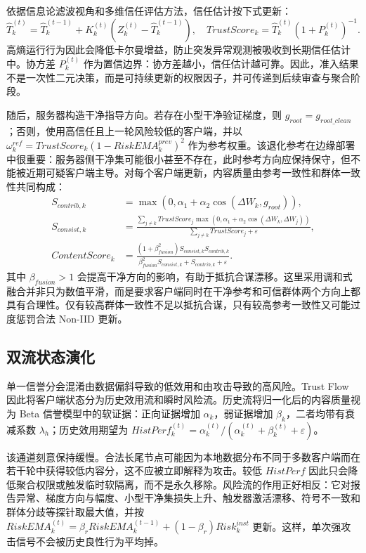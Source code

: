 \documentclass[10pt,a4paper,UTF8,fontset=fandol]{ctexart}
\begin{document}
依据信息论滤波视角\cite{chen2017maximum}和多维信任评估方法\cite{li2026multidimensional}，信任估计按下式更新：
\begin{equation}
    \hat{T}_{k}^{(t)}=\hat{T}_{k}^{(t-1)}+K_k^{(t)}(Z_k^{(t)}-\hat{T}_{k}^{(t-1)}),\quad
    TrustScore_k=\hat{T}_{k}^{(t)}(1+P_k^{(t)})^{-1}.
\end{equation}
高熵运行行为因此会降低卡尔曼增益，防止突发异常观测被吸收到长期信任估计中。协方差 $P_k^{(t)}$ 作为置信边界：协方差越小，信任估计越可靠。因此，准入结果不是一次性二元决策，而是可持续更新的权限因子，并可传递到后续审查与聚合阶段。

随后，服务器构造干净指导方向。若存在小型干净验证梯度，则 $g_{root}=g_{root\_clean}$；否则，使用高信任且上一轮风险较低的客户端，并以 $\omega_k^{ref}=TrustScore_k(1-RiskEMA_k^{prev})^2$ 作为参考权重。该退化参考在边缘部署中很重要：服务器侧干净集可能很小甚至不存在，此时参考方向应保持保守，但不能被近期可疑客户端主导。对每个客户端更新，内容质量由参考一致性和群体一致性共同构成：
\begin{align}
    S_{contrib,k}  & =\max(0,\alpha_1+\alpha_2\cos(\Delta W_k,g_{root})),                                  \\
    S_{consist,k}  & =\frac{\sum_{j\ne k}TrustScore_j\max(0,\alpha_1+\alpha_2\cos(\Delta W_k,\Delta W_j))}
    {\sum_{j\ne k}TrustScore_j+\varepsilon},                                                               \\
    ContentScore_k & =\frac{(1+\beta_{fusion}^2)S_{consist,k}S_{contrib,k}}
    {\beta_{fusion}^2S_{consist,k}+S_{contrib,k}+\varepsilon}.
\end{align}
其中 $\beta_{fusion}>1$ 会提高干净方向的影响，有助于抵抗合谋漂移。这里采用调和式融合并非只为数值平滑，而是要求客户端同时在干净参考和可信群体两个方向上都具有合理性。仅有较高群体一致性不足以抵抗合谋，只有较高参考一致性又可能过度惩罚合法 Non-IID 更新。

\subsection{双流状态演化}

单一信誉分会混淆由数据偏斜导致的低效用和由攻击导致的高风险。Trust Flow 因此将客户端状态分为历史效用流和瞬时风险流。历史流将归一化后的内容质量视为 Beta 信誉模型中的软证据：正向证据增加 $\alpha_k$，弱证据增加 $\beta_k$，二者均带有衰减系数 $\lambda_h$；历史效用期望为 $HistPerf_k^{(t)}=\alpha_k^{(t)}/(\alpha_k^{(t)}+\beta_k^{(t)}+\varepsilon)$。

该通道刻意保持缓慢。合法长尾节点可能因为本地数据分布不同于多数客户端而在若干轮中获得较低内容分，这不应被立即解释为攻击。较低 $HistPerf$ 因此只会降低聚合权限或触发临时软隔离，而不是永久移除。风险流的作用正好相反：它对报告异常、梯度方向与幅度、小型干净集损失上升、触发器激活漂移、符号不一致和群体分歧等探针取最大值，并按 $RiskEMA_k^{(t)}=\beta_rRiskEMA_k^{(t-1)}+(1-\beta_r)Risk_k^{inst}$ 更新。这样，单次强攻击信号不会被历史良性行为平均掉。
\end{document}
